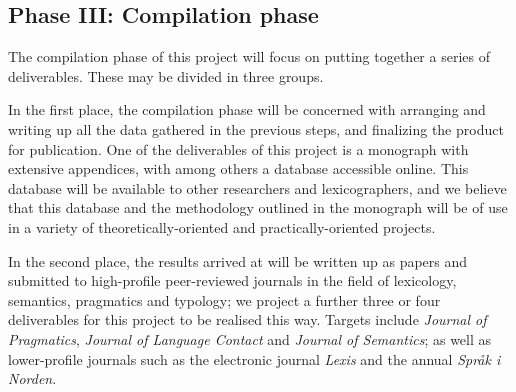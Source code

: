 \documentclass[a4paper]{article}
\begin{document}
	



\subsection{Phase III: Compilation phase}

The compilation phase of this project will focus on putting together a series of deliverables. These may be divided in three groups.

In the first place, the compilation phase will be concerned with arranging and writing up all the data gathered in the previous steps, and finalizing the product for publication. One of the deliverables of this project is a monograph with extensive appendices, with among others a database accessible online. This database will be available to other researchers and lexicographers, and we believe that this database and the methodology outlined in the monograph will be of use in a variety of theoretically-oriented and practically-oriented projects.

In the second place, the results arrived at will be written up as papers and submitted to high-profile peer-reviewed journals in the field of lexicology, semantics, pragmatics and typology; we project a further three or four deliverables for this project to be realised this way. Targets include \emph{Journal of Pragmatics}, \emph{Journal of Language Contact} and \emph{Journal of Semantics}; as well as lower-profile journals such as the electronic journal \emph{Lexis} and the annual \emph{Spr\aa k i Norden}.
\end{document}
